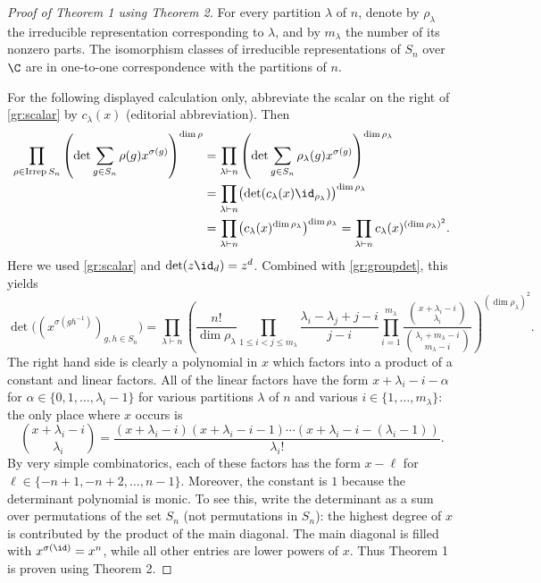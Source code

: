 \begin{proof}[Proof of Theorem 1 using Theorem 2]
For every partition $\lambda$ of $n$, denote by $\rho_\lambda$ the irreducible representation corresponding to $\lambda$, and by $m_\lambda$ the number of its nonzero parts. The isomorphism classes of irreducible representations of $S_n$ over $\C$ are in one-to-one correspondence with the partitions of $n$.

For the following displayed calculation only, abbreviate the scalar on the right of \eqref{gr:scalar} by $c_\lambda(x)$ (editorial abbreviation). Then
\begin{align*}
\prod_{\rho\in\operatorname{Irrep}S_n}
\left(\det\sum_{g\in S_n}\rho(g)x^{\sigma(g)}\right)^{\dim\rho}
&=\prod_{\lambda\vdash n}
\left(\det\sum_{g\in S_n}\rho_\lambda(g)x^{\sigma(g)}\right)^{\dim\rho_\lambda}\\
&=\prod_{\lambda\vdash n}\bigl(\det(c_\lambda(x)\id_{\rho_\lambda})\bigr)^{\dim\rho_\lambda}\\
&=\prod_{\lambda\vdash n}\bigl(c_\lambda(x)^{\dim\rho_\lambda}\bigr)^{\dim\rho_\lambda}
=\prod_{\lambda\vdash n}c_\lambda(x)^{(\dim\rho_\lambda)^2}.
\end{align*}
Here we used \eqref{gr:scalar} and $\det(z\id_d)=z^d$. Combined with \eqref{gr:groupdet}, this yields
\begin{equation}\label{gr:detanswer}
\det\bigl((x^{\sigma(gh^{-1})})_{g,h\in S_n}\bigr)
=\prod_{\lambda\vdash n}
\left(
\frac{n!}{\dim\rho_\lambda}
\prod_{1\le i<j\le m_\lambda}\frac{\lambda_i-\lambda_j+j-i}{j-i}
\prod_{i=1}^{m_\lambda}
\frac{\binom{x+\lambda_i-i}{\lambda_i}}
{\binom{\lambda_i+m_\lambda-i}{m_\lambda-i}}
\right)^{(\dim\rho_\lambda)^2}.
\end{equation}
The right hand side is clearly a polynomial in $x$ which factors into a product of a constant and linear factors. All of the linear factors have the form $x+\lambda_i-i-\alpha$ for $\alpha\in\{0,1,\ldots,\lambda_i-1\}$ for various partitions $\lambda$ of $n$ and various $i\in\{1,\ldots,m_\lambda\}$: the only place where $x$ occurs is
\[
\binom{x+\lambda_i-i}{\lambda_i}
=\frac{(x+\lambda_i-i)(x+\lambda_i-i-1)\cdots(x+\lambda_i-i-(\lambda_i-1))}{\lambda_i!}.
\]
By very simple combinatorics, each of these factors has the form $x-\ell$ for $\ell\in\{-n+1,-n+2,\ldots,n-1\}$. Moreover, the constant is $1$ because the determinant polynomial is monic. To see this, write the determinant as a sum over permutations of the set $S_n$ (not permutations in $S_n$): the highest degree of $x$ is contributed by the product of the main diagonal. The main diagonal is filled with $x^{\sigma(\id)}=x^n$, while all other entries are lower powers of $x$. Thus Theorem 1 is proven using Theorem 2.
\end{proof}

